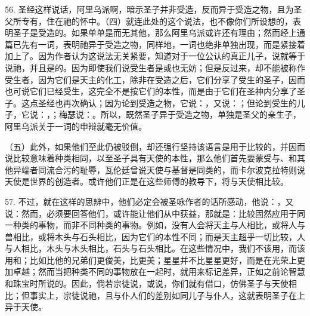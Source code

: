 56. 圣经这样说话，阿里乌派啊，暗示圣子并非受造，反而异于受造之物，且为圣父所专有，住在祂的怀中。（四）就连此处的这个说法，也不像你们所设想的，表明圣子是受造的。如果单单是而无其他，那么阿里乌派或许还有理由；然而经上通篇已先有一词，表明祂异于受造之物，同样地，一词也绝非单独出现，而是紧接着加上了。因为作者认为这说法无关紧要，知道对于一位公认的真正儿子，说就等于说祂，并且是的。因为即使我们说受生者是或也无妨；但是反过来，却不能被称作受生者，因为它们是天主的化工，除非在受造之后，它们分享了受生的圣子，因而也可说它们已经受生，这完全不是按它们的本性，而是由于它们在圣神内分享了圣子。这点圣经也再次确认；因为论到受造之物，它说：，又说：；但论到受生的儿子，它说：，；梅瑟说：。所以，既然圣子异于受造之物，单独是圣父的亲生子，阿里乌派关于一词的申辩就毫无价值。\par

（五）此外，如果他们至此仍被驳倒，却还强行坚持该语言是用于比较的，并因而说比较意味着种类相同，以至圣子具有天使的本性，那么他们首先要蒙受与、和其他异端者同流合污的耻辱，瓦伦廷曾说天使与基督是同类的，而卡尔波克拉特则说天使是世界的创造者。或许他们正是在这些师傅的教导下，将与天使相比较。\par

57. 不过，就在这样的思辨中，他们必定会被圣咏作者的话所感动，他说：，又说：然而，必须要回答他们，或许能让他们从中获益，那就是：比较固然应用于同一种类的事物，而非不同种类的事物。例如，没有人会将天主与人相比，或将人与兽相比，或将木头与石头相比，因为它们的本性不同；而是天主超乎一切比较，人与人相比，木头与木头相比，石头与石头相比。在这些情况中，我们不该用，而该用和；比如比他的兄弟们更俊美，比更美；星星并不比星星更好，而是在光荣上更加卓越；然而当把种类不同的事物放在一起时，就用来标记差异，正如之前论智慧和珠宝时所说的。因此，倘若宗徒说，或说，你们就有借口，仿佛圣子与天使相比；但事实上，宗徒说祂，且与仆人们的差别如同儿子与仆人，这就表明圣子在上异于天使。\par

